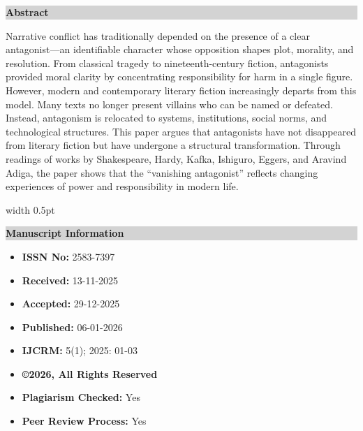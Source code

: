 \documentclass[12pt,a4paper]{article}
\begin{document}
\noindent
\begin{tcolorbox}[
    colback=white,
    colframe=black!70,
    boxrule=0.6pt,
    arc=0pt,
    left=0pt,
    right=0pt,
    top=0pt,
    bottom=0pt,
]

\begin{minipage}[t]{0.64\textwidth}

\fontsize{9}{11}\selectfont

\noindent
\colorbox{lightgray}{
\parbox{\dimexpr\linewidth-2\fboxsep}{
\vspace{2pt}
\textcolor{journalblue}{\textbf{Abstract}}
\vspace{2pt}
}}

\vspace{4pt}

Narrative conflict has traditionally depended on the presence of a clear antagonist—an 
identifiable character whose opposition shapes plot, morality, and resolution. From classical 
tragedy to nineteenth-century fiction, antagonists provided moral clarity by concentrating 
responsibility for harm in a single figure. However, modern and contemporary literary fiction 
increasingly departs from this model. Many texts no longer present villains who can be named 
or defeated. Instead, antagonism is relocated to systems, institutions, social norms, and 
technological structures. This paper argues that antagonists have not disappeared from literary 
fiction but have undergone a structural transformation. Through readings of works by 
Shakespeare, Hardy, Kafka, Ishiguro, Eggers, and Aravind Adiga, the paper shows that the 
“vanishing antagonist” reflects changing experiences of power and responsibility in modern 
life. 

\end{minipage}
\hfill
\vrule width 0.5pt
\hfill
\begin{minipage}[t]{0.34\textwidth}

\fontsize{8.5}{10}\selectfont

\noindent
\colorbox{lightgray}{
\parbox{\dimexpr\linewidth-2\fboxsep}{
\vspace{2pt}
\centering \textcolor{journalblue}{\textbf{Manuscript Information}}
\vspace{2pt}
}}

\begin{itemize}[leftmargin=*, itemsep=-4pt]
\item \textbf{ISSN No:} 2583-7397
\item \textbf{Received:} 13-11-2025
\item \textbf{Accepted:} 29-12-2025
\item \textbf{Published:} 06-01-2026
\item \textbf{IJCRM:} 5(1); 2025: 01-03
\item \textbf{©2026, All Rights Reserved}
\item \textbf{Plagiarism Checked:} Yes
\item \textbf{Peer Review Process:} Yes
\end{itemize}


\end{minipage}
\end{tcolorbox}
\end{document}
